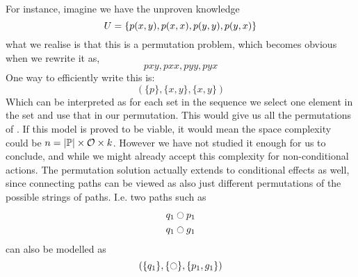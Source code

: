 \documentclass[../Master.tex]{subfiles}
\begin{document}
For instance, imagine we have the unproven knowledge
 \begin{equation*}
	U = \{ p(x,y), p(x,x), p(y,y), p(y,x) \}
 \end{equation*} 
 what we realise is that this is a permutation problem, which becomes obvious when we rewrite it as,
 \begin{equation}\label{eq:dis:sc:perms}
 	pxy, pxx, pyy, pyx 
 \end{equation} 
 One way to efficiently write this is:
  \begin{equation*}
  	(\{p\},\{x,y\},\{x,y\}) 
  \end{equation*} 
 Which can be interpreted as for each set in the sequence we select one element in the set and use that in our permutation.
 This would give us all the permutations of . 
 If this model is proved to be viable, it would mean the space complexity could be $n = |\mathbb{P}| \times \mathcal{O} \times k$. 
 However we have not studied it enough for us to conclude,
 and while we might already accept this complexity for non-conditional actions. 
 The permutation solution actually extends to conditional effects as well, since connecting paths can be viewed as also just different permutations of the possible strings of paths.
 I.e. two paths such as 
 \begin{align*}
	q_1 &\ocircle p_1 \\
	q_1 &\ocircle g_1
 \end{align*} 
 can also be modelled as
 \begin{equation*}
 	(\{q_1\},\{\ocircle\},\{p_1,g_1\}) 
 \end{equation*} 
\end{document}
